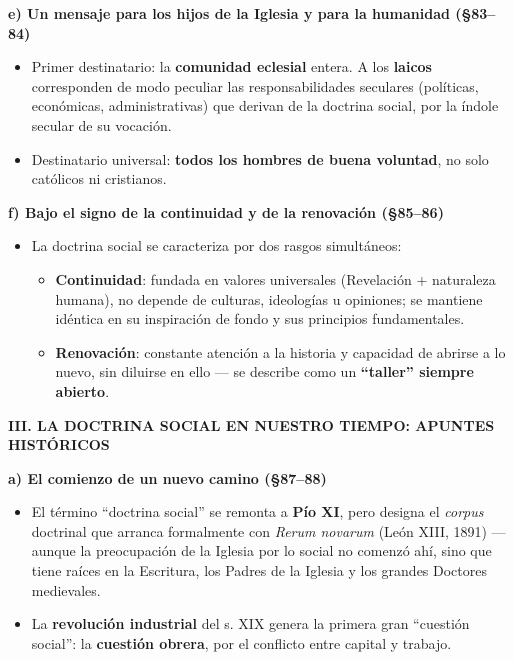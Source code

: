 \documentclass[10pt,a4paper]{article}
\begin{document}
\medskip\noindent \textbf{e) Un mensaje para los hijos de la Iglesia y para la humanidad (\S{}83--84)}\par\nopagebreak
\begin{itemize}
\item Primer destinatario: la \textbf{comunidad eclesial} entera. A los \textbf{laicos} corresponden de modo peculiar las responsabilidades seculares (políticas, económicas, administrativas) que derivan de la doctrina social, por la índole secular de su vocación.
\item Destinatario universal: \textbf{todos los hombres de buena voluntad}, no solo católicos ni cristianos.
\end{itemize}

\medskip\noindent \textbf{f) Bajo el signo de la continuidad y de la renovación (\S{}85--86)}\par\nopagebreak
\begin{itemize}
\item La doctrina social se caracteriza por dos rasgos simultáneos:
\begin{itemize}
\item \textbf{Continuidad}: fundada en valores universales (Revelación + naturaleza humana), no depende de culturas, ideologías u opiniones; se mantiene idéntica en su inspiración de fondo y sus principios fundamentales.
\item \textbf{Renovación}: constante atención a la historia y capacidad de abrirse a lo nuevo, sin diluirse en ello --- se describe como un \textbf{``taller'' siempre abierto}.
\end{itemize}
\end{itemize}

\medskip\noindent \textbf{III. LA DOCTRINA SOCIAL EN NUESTRO TIEMPO: APUNTES HISTÓRICOS}\par\nopagebreak

\medskip\noindent \textbf{a) El comienzo de un nuevo camino (\S{}87--88)}\par\nopagebreak
\begin{itemize}
\item El término ``doctrina social'' se remonta a \textbf{Pío XI}, pero designa el \textit{corpus} doctrinal que arranca formalmente con \textit{Rerum novarum} (León XIII, 1891) --- aunque la preocupación de la Iglesia por lo social no comenzó ahí, sino que tiene raíces en la Escritura, los Padres de la Iglesia y los grandes Doctores medievales.
\item La \textbf{revolución industrial} del s. XIX genera la primera gran ``cuestión social'': la \textbf{cuestión obrera}, por el conflicto entre capital y trabajo.
\end{itemize}
\end{document}
